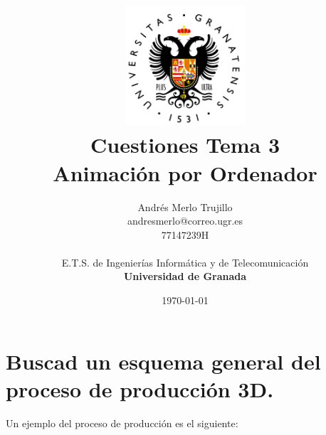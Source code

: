 \documentclass{article}
\title{
\includegraphics[width=1.75in]{imagenes/UGR-Logo.png} \\
\vspace*{1in}
\textbf{Cuestiones Tema 3} \\
Animación por Ordenador \\
\vspace*{0.5in}}
\author{Andrés Merlo Trujillo \\
andresmerlo@correo.ugr.es \\
77147239H \\ 
\vspace*{0.5in} \\
E.T.S. de Ingenierías Informática y de Telecomunicación \\
\textbf{Universidad de Granada}} \date{\today}
\begin{document}
\begin{titlingpage}
\maketitle
\end{titlingpage}

\tableofcontents

\newpage

\pagestyle{fancy}   %


\section{Buscad un esquema general del proceso de producción 3D.}

Un ejemplo del proceso de producción es el siguiente:
\end{document}
